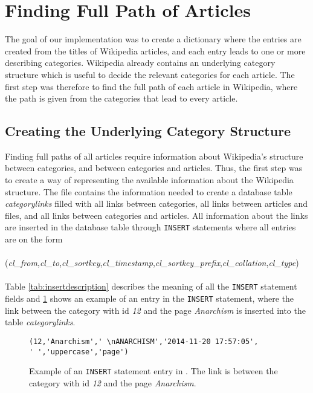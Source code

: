 \section{Finding Full Path of Articles}
The goal of our implementation was to create a dictionary where the entries are created from the titles of Wikipedia articles, and each entry leads to one or more describing categories. Wikipedia already contains an underlying category structure which is useful to decide the relevant categories for each article. The first step was therefore to find the full path of each article in Wikipedia, where the path is given from the categories that lead to every article. 



\subsection{Creating the Underlying Category Structure}
Finding full paths of all articles require information about Wikipedia's structure between categories, and between categories and articles. Thus, the first step was to create a way of representing the available information about the Wikipedia structure. %
The file \enwikicatlink contains the information needed to create a database table \emph{categorylinks} filled with all links between categories, all links between articles and files, and all links between categories and articles. All information about the links are inserted in the database table through \texttt{INSERT} statements where all entries are on the form\\\\
(\emph{cl\_from},\emph{cl\_to},\emph{cl\_sortkey},\emph{cl\_timestamp},\emph{cl\_sortkey\_prefix},\emph{cl\_collation},\emph{cl\_type})\\\\
    Table \ref{tab:insertdescription} describes the meaning of all the \texttt{INSERT} statement fields \cite{wiki:categorylinkstable} and \ref{fig:entryexample} shows an example of an entry in the \texttt{INSERT} statement, where the link between the category with id \emph{12} and the  page \emph{Anarchism} is inserted into the table \emph{categorylinks}.  


\begin{figure}[h]
\centering
\begin{lstlisting}
(12,'Anarchism',' \nANARCHISM','2014-11-20 17:57:05',
' ','uppercase','page')
\end{lstlisting}
\caption[\texttt{INSERT} statement entry in \texttt{enwiki-latest-categorylinks.sql.gz}]{Example of an \texttt{INSERT} statement entry in \enwikicatlink. The link is between the category with id \emph{12} and the page \emph{Anarchism}.}
\label{fig:entryexample}
\end{figure}


